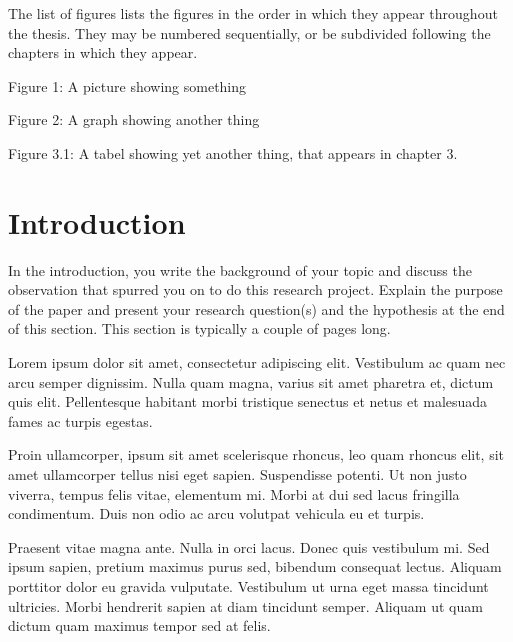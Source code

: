 \documentclass[12pt,a4paper]{report}
\newcommand{\pbreak}{\vskip 0.5cm}
\newcommand{\daechapter}[1]{
  \chapter*{#1} %
  \addcontentsline{toc}{chapter}{#1} %
}
\begin{document}
\begin{ybox}
The list of figures lists the figures in the order in which they appear throughout the thesis. They may be numbered sequentially, or be subdivided following the chapters in which they appear.
\end{ybox}

\begin{ybox}
Figure 1: A picture showing something
\end{ybox}

\begin{ybox}
Figure 2: A graph showing another thing
\end{ybox}

\begin{ybox}
Figure 3.1: A tabel showing yet another thing, that appears in chapter 3.
\end{ybox}

\daechapter{Introduction}

\begin{ybox}
In the introduction, you write the background of your topic and discuss the observation that spurred you on to do this research project. Explain the purpose of the paper and present your research question(s) and the hypothesis at the end of this section. This section is typically a couple of pages long.
\end{ybox}
\pbreak
\begin{gbox}
Lorem ipsum dolor sit amet, consectetur adipiscing elit. Vestibulum ac quam nec arcu semper dignissim. Nulla quam magna, varius sit amet pharetra et, dictum quis elit. Pellentesque habitant morbi tristique senectus et netus et malesuada fames ac turpis egestas.
\end{gbox}
\pbreak
\begin{gbox}
Proin ullamcorper, ipsum sit amet scelerisque rhoncus, leo quam rhoncus elit, sit amet ullamcorper tellus nisi eget sapien. Suspendisse potenti. Ut non justo viverra, tempus felis vitae, elementum mi. Morbi at dui sed lacus fringilla condimentum. Duis non odio ac arcu volutpat vehicula eu et turpis.
\end{gbox}
\pbreak
\begin{gbox}
Praesent vitae magna ante. Nulla in orci lacus. Donec quis vestibulum mi. Sed ipsum sapien, pretium maximus purus sed, bibendum consequat lectus. Aliquam porttitor dolor eu gravida vulputate. Vestibulum ut urna eget massa tincidunt ultricies. Morbi hendrerit sapien at diam tincidunt semper. Aliquam ut quam dictum quam maximus tempor sed at felis.
\end{gbox}
\end{document}
